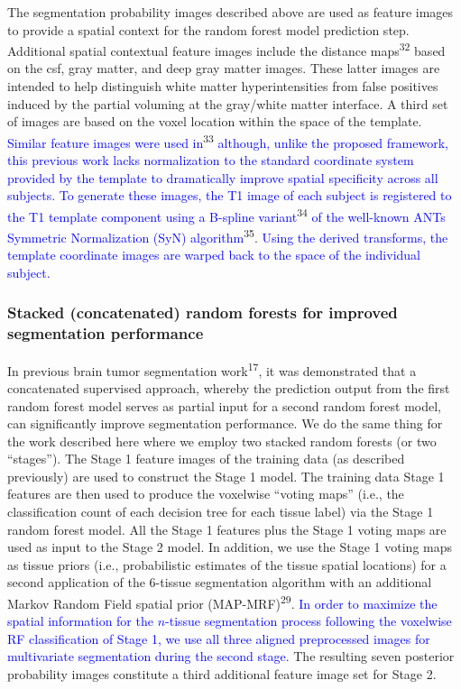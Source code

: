 \documentclass[11pt,]{article}
\begin{document}
The segmentation probability images described above are used as feature
images to provide a spatial context for the random forest model
prediction step. Additional spatial contextual feature images include
the distance maps\textsuperscript{32} based on the csf, gray matter, and
deep gray matter images. These latter images are intended to help
distinguish white matter hyperintensities from false positives induced
by the partial voluming at the gray/white matter interface. A third set
of images are based on the voxel location within the space of the
template.
\textcolor{blue}{Similar feature images were used in}\textsuperscript{33}
\textcolor{blue}{although, unlike the proposed framework, this previous work lacks
normalization to the standard
coordinate system provided by the template to dramatically improve spatial specificity
across all subjects.  To generate these images, the T1 image of each subject is
registered to the T1 template component using a B-spline variant}\textsuperscript{34}
\textcolor{blue}{of the well-known ANTs Symmetric Normalization (SyN) algorithm}\textsuperscript{35}.
\textcolor{blue}{Using the derived transforms, the template coordinate images are warped back to the space of the individual subject.}

\subsubsection{Stacked (concatenated) random forests for improved
segmentation
performance}\label{stacked-concatenated-random-forests-for-improved-segmentation-performance}

In previous brain tumor segmentation work\textsuperscript{17}, it was
demonstrated that a concatenated supervised approach, whereby the
prediction output from the first random forest model serves as partial
input for a second random forest model, can significantly improve
segmentation performance. We do the same thing for the work described
here where we employ two stacked random forests (or two ``stages''). The
Stage 1 feature images of the training data (as described previously)
are used to construct the Stage 1 model. The training data Stage 1
features are then used to produce the voxelwise ``voting maps'' (i.e.,
the classification count of each decision tree for each tissue label)
via the Stage 1 random forest model. All the Stage 1 features plus the
Stage 1 voting maps are used as input to the Stage 2 model. In addition,
we use the Stage 1 voting maps as tissue priors (i.e., probabilistic
estimates of the tissue spatial locations) for a second application of
the \(6\)-tissue segmentation algorithm with an additional Markov Random
Field spatial prior (MAP-MRF)\textsuperscript{29}.
\textcolor{blue}{In order to maximize the spatial information for the $n$-tissue segmentation process following the voxelwise RF classification of Stage 1, we use
all three aligned preprocessed images for multivariate segmentation during the
second stage.} The resulting seven posterior probability images
constitute a third additional feature image set for Stage 2.
\end{document}

